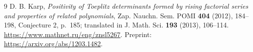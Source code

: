 \documentclass[11pt]{article}
\begin{document}
\begin{thebibliography}{9}
D. B. Karp,
\emph{Positivity of Toeplitz determinants formed by rising factorial series
and properties of related polynomials},
Zap. Nauchn. Sem. POMI \textbf{404} (2012), 184--198,
Conjecture 2, p.~185; translated in
J. Math. Sci. \textbf{193} (2013), 106--114.
\url{https://www.mathnet.ru/eng/znsl5267}.
Preprint: \url{https://arxiv.org/abs/1203.1482}.
\end{thebibliography}
\end{document}

